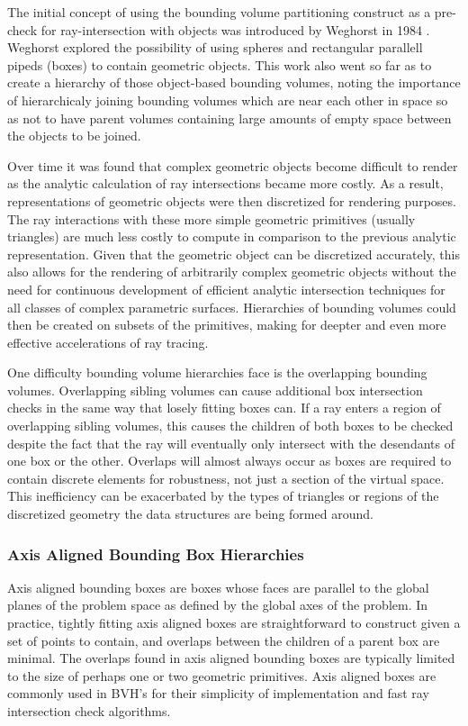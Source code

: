 \documentclass[10pt, a4paper]{article}
\begin{document}
The initial concept of using the bounding volume partitioning construct as a pre-check for ray-intersection with objects was introduced by Weghorst in 1984 \cite{Weghorst:1984:ICM}. Weghorst explored the possibility of using spheres and rectangular parallell pipeds (boxes) to contain geometric objects. This work also went so far as to create a hierarchy of those object-based bounding volumes, noting the importance of hierarchicaly joining bounding volumes which are near each other in space so as not to have parent volumes containing large amounts of empty space between the objects to be joined.

Over time it was found that complex geometric objects become difficult to render as the analytic calculation of ray intersections became more costly. As a result, representations of geometric objects were then discretized for rendering purposes. The ray interactions with these more simple geometric primitives (usually triangles) are much less costly to compute in comparison to the previous analytic representation. Given that the geometric object can be discretized accurately, this also allows for the rendering of arbitrarily complex geometric objects without the need for continuous development of efficient analytic intersection techniques for all classes of complex parametric surfaces. Hierarchies of bounding volumes could then be created on subsets of the primitives, making for deepter and even more effective accelerations of ray tracing.

One difficulty bounding volume hierarchies face is the overlapping bounding volumes. Overlapping sibling volumes can cause additional box intersection checks in the same way that losely fitting boxes can. If a ray enters a region of overlapping sibling volumes, this causes the children of both boxes to be checked despite the fact that the ray will eventually only intersect with the desendants of one box or the other. Overlaps will almost always occur as boxes are required to contain discrete elements for robustness, not just a section of the virtual space. This inefficiency can be exacerbated by the types of triangles or regions of the discretized geometry the data structures are being formed around.


\subsubsection{Axis Aligned Bounding Box Hierarchies}%

Axis aligned bounding boxes are boxes whose faces are parallel to the global planes of the problem space as defined by the global axes of the problem. In practice, tightly fitting axis aligned boxes are straightforward to construct given a set of points to contain, and overlaps between the children of a parent box are minimal. The overlaps found in axis aligned bounding boxes are typically limited to the size of perhaps one or two geometric primitives. Axis aligned boxes are commonly used in BVH's for their simplicity of implementation and fast ray intersection check algorithms.
\end{document}
